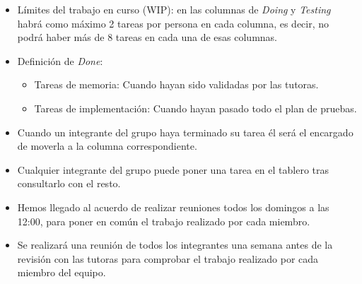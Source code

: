 \begin{itemize}
    \item Límites del trabajo en curso (WIP): en las columnas de \textit{Doing} y \textit{Testing} habrá como máximo 2 tareas por persona en cada columna, es decir, no podrá haber más de 8 tareas en cada una de esas columnas.
    \item Definición de \textit{Done}:
          \begin{itemize}
              \item Tareas de memoria: Cuando hayan sido validadas por las tutoras.
              \item Tareas de implementación: Cuando hayan pasado todo el plan de pruebas.
          \end{itemize}
    \item Cuando un integrante del grupo haya terminado su tarea él será el encargado de moverla a la columna correspondiente.
    \item Cualquier integrante del grupo puede poner una tarea en el tablero tras consultarlo con el resto.
    \item Hemos llegado al acuerdo de realizar reuniones todos los domingos a las 12:00, para poner en común el trabajo realizado por cada miembro.
    \item Se realizará una reunión de todos los integrantes una semana antes de la revisión con las tutoras para comprobar el trabajo realizado por cada miembro del equipo.
\end{itemize}

